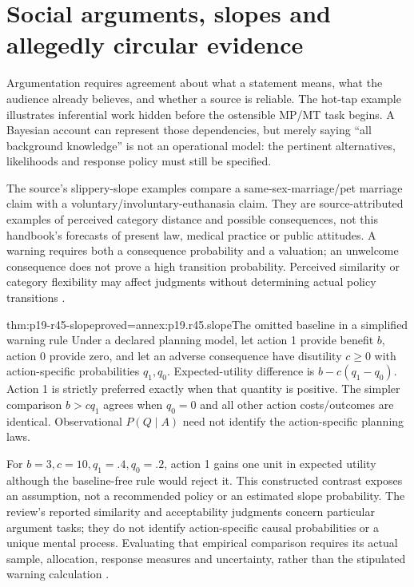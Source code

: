 \section{Social arguments, slopes and allegedly circular evidence}
\label{sec:p19-r45-argumentation}

Argumentation requires agreement about what a statement means, what
the audience already believes, and whether a source is reliable.
The hot-tap example illustrates inferential work hidden before the
ostensible MP/MT task begins. A Bayesian account can represent those
dependencies, but merely saying ``all background knowledge'' is not
an operational model: the pertinent alternatives, likelihoods and
response policy must still be specified.

The source's slippery-slope examples compare a same-sex-marriage/pet
marriage claim with a voluntary/involuntary-euthanasia claim. They
are source-attributed examples of perceived category distance and
possible consequences, not this handbook's forecasts of present law,
medical practice or public attitudes. A warning requires both a
consequence probability and a valuation; an unwelcome consequence
does not prove a high transition probability. Perceived similarity or
category flexibility may affect judgments without determining actual
policy transitions \cite[pp.~290--291]{ChaterOaksford2021BayesianReasoning}.

\begin{hblemma}{thm:p19-r45-slope}{proved=annex:p19.r45.slope}{The omitted baseline in a simplified warning rule}
Under a declared planning model, let action 1 provide benefit \(b\),
action 0 provide zero, and let an adverse consequence have disutility
\(c\geq0\) with action-specific probabilities \(q_1,q_0\).
Expected-utility difference is \(b-c(q_1-q_0)\).
Action 1 is strictly preferred exactly when that quantity is positive.
The simpler comparison \(b>cq_1\) agrees when \(q_0=0\)
and all other action costs/outcomes are identical. Observational
\(P(Q\mid A)\) need not identify the action-specific planning laws.
\end{hblemma}

For \(b=3,c=10,q_1=.4,q_0=.2\), action 1 gains one unit in
expected utility although the baseline-free rule would reject it.
This constructed contrast exposes an assumption, not a recommended
policy or an estimated slope probability. The review's reported
similarity and acceptability judgments concern particular argument tasks;
they do not identify action-specific causal probabilities or a unique
mental process. Evaluating that empirical comparison requires its actual
sample, allocation, response measures and uncertainty, rather than the
stipulated warning calculation
\cite[pp.~291--292]{ChaterOaksford2021BayesianReasoning}.

